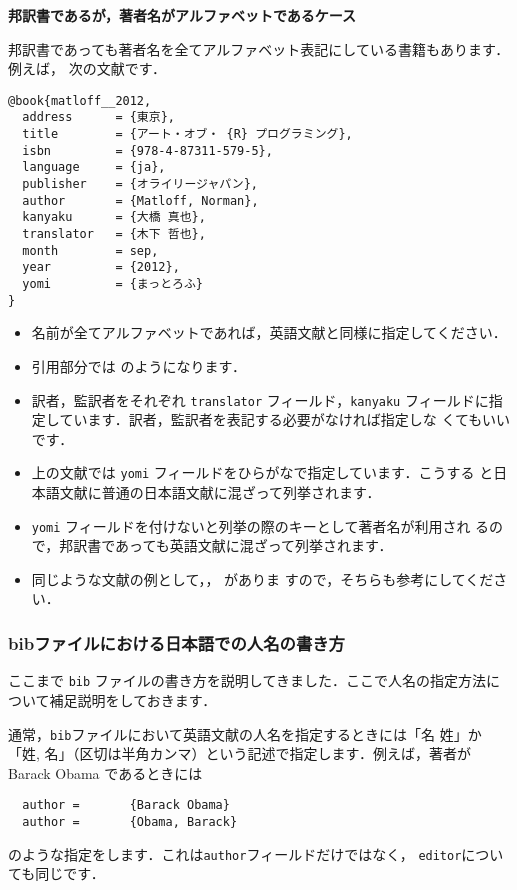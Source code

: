 \documentclass[a4j,10pt]{jarticle}
\begin{document}
\vspace*{1em}

\noindent \textbf{邦訳書であるが，著者名がアルファベットであるケース}

邦訳書であっても著者名を全てアルファベット表記にしている書籍もあります．例えば，
次の文献です．
\begin{screen}
\begin{verbatim}
@book{matloff__2012,
  address      = {東京},
  title        = {アート・オブ・ {R} プログラミング},
  isbn         = {978-4-87311-579-5},
  language     = {ja},
  publisher    = {オライリージャパン},
  author       = {Matloff, Norman},
  kanyaku      = {大橋 真也},
  translator   = {木下 哲也},
  month        = sep,
  year         = {2012},
  yomi         = {まっとろふ}
}
\end{verbatim}
\end{screen}
\begin{itemize}
 \item 名前が全てアルファベットであれば，英語文献と同様に指定してください．
 \item 引用部分では \citet{matloff__2012} のようになります．
 \item 訳者，監訳者をそれぞれ \texttt{translator} フィールド，\texttt{kanyaku}
       フィールドに指定しています．訳者，監訳者を表記する必要がなければ指定しな
       くてもいいです．
 \item 上の文献では \texttt{yomi} フィールドをひらがなで指定しています．こうする
       と日本語文献に普通の日本語文献に混ざって列挙されます．
 \item \texttt{yomi} フィールドを付けないと列挙の際のキーとして著者名が利用され
       るので，邦訳書であっても英語文献に混ざって列挙されます．
 \item 同じような文献の例として，\citet{Ryza2016}，\citet{Boswell-2012} がありま
       すので，そちらも参考にしてください．
\end{itemize}

\subsubsection{bibファイルにおける日本語での人名の書き方}
\label{sec:nihonjin}

ここまで \texttt{bib} ファイルの書き方を説明してきました．ここで人名の指定方法に
ついて補足説明をしておきます．

通常，\texttt{bib}ファイルにおいて英語文献の人名を指定するときには「名 姓」か
「姓, 名」（区切は半角カンマ）という記述で指定します．例えば，著者が Barack
Obama であるときには
\begin{screen}
 \begin{verbatim}
  author =       {Barack Obama}
  author =       {Obama, Barack}
 \end{verbatim}
\end{screen}
のような指定をします．これは\texttt{author}フィールドだけではなく，
\texttt{editor}についても同じです．
\end{document}
